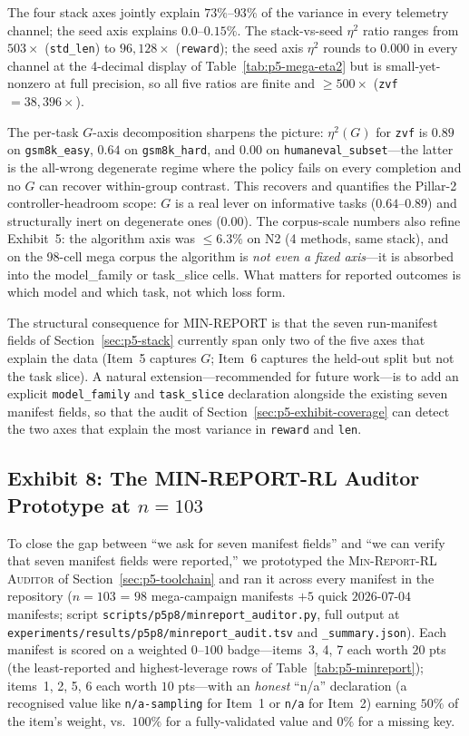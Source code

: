 \documentclass{article}  \usepackage[preprint,nonatbib]{neurips_2026} \usepackage[numbers]{natbib}
\providecommand{\tableref}[1]{Table~\ref{#1}}
\providecommand{\secref}[1]{Section~\ref{#1}}
\begin{document}
The four stack axes jointly explain $73\%$--$93\%$ of the variance in every
telemetry channel; the seed axis explains $0.0$--$0.15\%$. The
stack-vs-seed $\eta^{2}$ ratio ranges from $503\times$ (\texttt{std\_len})
to $96{,}128\times$ (\texttt{reward}); the seed axis $\eta^{2}$ rounds to
$0.000$ in every channel at the 4-decimal display of
\tableref{tab:p5-mega-eta2} but is small-yet-nonzero at full precision, so
all five ratios are finite and $\ge 500\times$ (\texttt{zvf} $= 38{,}396\times$).

The per-task $G$-axis decomposition sharpens the picture: $\eta^{2}(G)$
for \texttt{zvf} is $0.89$ on \texttt{gsm8k\_easy}, $0.64$ on
\texttt{gsm8k\_hard}, and $0.00$ on \texttt{humaneval\_subset}---the latter
is the all-wrong degenerate regime where the policy fails on every
completion and no $G$ can recover within-group contrast. This recovers
and quantifies the Pillar-2 controller-headroom scope: $G$ is a real lever
on informative tasks ($0.64$--$0.89$) and structurally inert on degenerate
ones ($0.00$). The corpus-scale numbers also refine Exhibit~5: the
algorithm axis was $\le 6.3\%$ on N2 (4 methods, same stack), and on the
98-cell mega corpus the algorithm is \emph{not even a fixed axis}---it
is absorbed into the model\_family or task\_slice cells. What matters for
reported outcomes is which model and which task, not which loss form.

The structural consequence for MIN-REPORT is that the seven run-manifest fields of
\secref{sec:p5-stack} currently span only two of the five axes that
explain the data (Item~5 captures $G$; Item~6 captures the held-out split
but not the task slice). A natural extension---recommended for future
work---is to add an explicit \texttt{model\_family} and
\texttt{task\_slice} declaration alongside the existing seven manifest fields, so
that the audit of \secref{sec:p5-exhibit-coverage} can detect the two
axes that explain the most variance in \texttt{reward} and \texttt{len}.

\subsection{Exhibit 8: The MIN-REPORT-RL Auditor Prototype at $n=103$}
\label{sec:p5-exhibit-auditor}
To close the gap between ``we ask for seven manifest fields'' and ``we can verify
that seven manifest fields were reported,'' we prototyped the
\textsc{Min-Report-RL Auditor} of \secref{sec:p5-toolchain} and ran it
across every manifest in the repository
($n=103$ = $98$ mega-campaign manifests $+5$ quick $2026$-$07$-$04$
manifests; script \texttt{scripts/p5p8/minreport\_auditor.py}, full
output at
\texttt{experiments/results/p5p8/minreport\_audit.tsv} and
\texttt{\_summary.json}). Each manifest is scored on a weighted $0$--$100$
badge---items~3, 4, 7 each worth $20$ pts (the least-reported and
highest-leverage rows of \tableref{tab:p5-minreport}); items~1, 2, 5, 6
each worth $10$ pts---with an \emph{honest} ``n/a'' declaration (a
recognised value like \texttt{n/a-sampling} for Item~1 or \texttt{n/a}
for Item~2) earning $50\%$ of the item's weight, vs.\ $100\%$ for a
fully-validated value and $0\%$ for a missing key.
\end{document}
